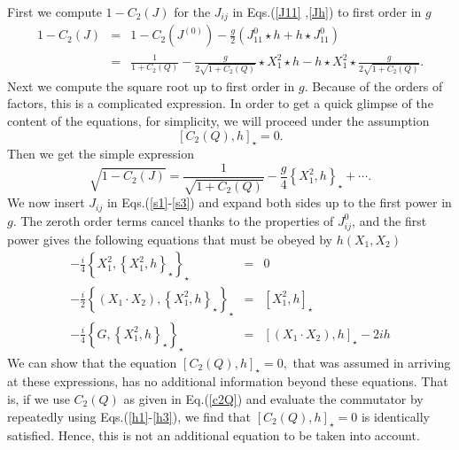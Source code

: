 \documentclass[a4paper,12pt]{article}
\begin{document}
First we compute $1-C_{2}\left( J\right) $ for the $J_{ij}$ in Eqs.(\ref{J11}%
,\ref{Jh}) to first order in $g$ 
\begin{eqnarray}
1-C_{2}\left( J\right) &=&1-C_{2}\left( J^{\left( 0\right) }\right) -\frac{g%
}{2}\left( J_{11}^{0}\star h+h\star J_{11}^{0}\right) \\
&=&\frac{1}{1+C_{2}\left( Q\right) }-\frac{g}{2\sqrt{1+C_{2}\left( Q\right) }%
}\star X_{1}^{2}\star h-h\star X_{1}^{2}\star \frac{g}{2\sqrt{1+C_{2}\left(
Q\right) }}.
\end{eqnarray}
Next we compute the square root up to first order in $g.$ Because of the
orders of factors, this is a complicated expression. In order to get a quick
glimpse of the content of the equations, for simplicity, we will proceed
under the assumption 
\begin{equation}
\left[ C_{2}\left( Q\right) ,h\right] _{\star }=0.
\end{equation}
Then we get the simple expression 
\begin{equation}
\sqrt{1-C_{2}\left( J\right) }=\frac{1}{\sqrt{1+C_{2}\left( Q\right) }}-%
\frac{g}{4}\left\{ X_{1}^{2},h\right\} _{\star }+\cdots .
\end{equation}
We now insert $J_{ij}$ in Eqs.(\ref{s1}-\ref{s3}) and expand both sides up
to the first power in $g$. The zeroth order terms cancel thanks to the
properties of $J_{ij}^{0}$, and the first power gives the following
equations that must be obeyed by $h\left( X_{1},X_{2}\right) $ 
\begin{eqnarray}
-\frac{i}{4}\left\{ X_{1}^{2},\left\{ X_{1}^{2},h\right\} _{\star }\right\}
_{\star } &=&0  \label{h1} \\
-\frac{i}{2}\left\{ \left( X_{1}\cdot X_{2}\right) ,\left\{
X_{1}^{2},h\right\} _{\star }\right\} _{\star } &=&\left[ X_{1}^{2},h\right]
_{\star }  \label{h2} \\
-\frac{i}{4}\left\{ G,\left\{ X_{1}^{2},h\right\} _{\star }\right\} _{\star
} &=&\left[ \left( X_{1}\cdot X_{2}\right) ,h\right] _{\star }-2ih
\label{h3}
\end{eqnarray}
We can show that the equation $\left[ C_{2}\left( Q\right) ,h\right] _{\star
}=0,$ that was assumed in arriving at these expressions, has no additional
information beyond these equations. That is, if we use $C_{2}\left( Q\right) 
$ as given in Eq.(\ref{c2Q}) and evaluate the commutator by repeatedly using
Eqs.(\ref{h1}-\ref{h3}), we find that $\left[ C_{2}\left( Q\right) ,h\right]
_{\star }=0$ is identically satisfied. Hence, this is not an additional
equation to be taken into account.
\end{document}
